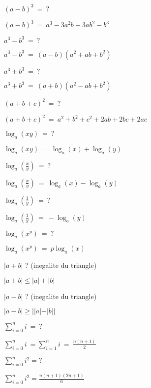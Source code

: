 \documentclass[12pt]{article}
\newcommand*{\xfield}[1]{\begin{mdframed}\centering #1\end{mdframed}\bigskip}
\newenvironment{note}{}{}
\begin{document}
\begin{note}
    \xfield{$(a-b)^3\ =\ ?$}
    \xfield{$(a-b)^3\ =\ a^3 - 3a^2b+3ab^2-b^3$}
\end{note}

\begin{note}
    \xfield{$a^3-b^3\ =\ ?$}
    \xfield{$a^3-b^3\ =\ (a-b)(a^2+ab+b^2)$}
\end{note}

\begin{note}
    \xfield{$a^3+b^3\ =\ ?$}
    \xfield{$a^3+b^3\ =\ (a+b)(a^2-ab+b^2)$}
\end{note}

\begin{note}
    \xfield{$(a+b+c)^2\ =\ ?$}
    \xfield{$(a+b+c)^2\ =\ a^2+b^2+c^2+2ab+2bc+2ac$}
\end{note}

\begin{note}
    \xfield{$\log_a(xy)\ =\ ?$}
    \xfield{$\log_a(xy)\ =\ \log_a(x)+\log_a(y)$}
\end{note}

\begin{note}
    \xfield{$\log_a(\frac{x}{y})\ =\ ?$}
    \xfield{$\log_a(\frac{x}{y})\ =\ \log_a(x)-\log_a(y)$}
\end{note}

\begin{note}
    \xfield{$\log_a(\frac{1}{y})\ =\ ?$}
    \xfield{$\log_a(\frac{1}{y})\ =\ -\log_a(y)$}
\end{note}

\begin{note}
    \xfield{$\log_a(x^p)\ =\ ?$}
    \xfield{$\log_a(x^p)\ =\ p \log_a(x)$}
\end{note}

\begin{note}
    \xfield{$|a+b|$ ? (inegalite du triangle)}
    \xfield{$ |a+b| \leqslant |a| + |b|\ $}
\end{note}

\begin{note}
    \xfield{$|a-b|$ ? (inegalite du triangle)}
    \xfield{$|a - b| \geqslant ||a|-|b||$}
\end{note}

\begin{note}
    \xfield{$\sum_{i=0}^n i\ =\ ? $}
    \xfield{$\sum_{i=0}^n i\ = \sum_{i=1}^n i\ =\ \frac{n(n+1)}{2}$}
\end{note}

\begin{note}
    \xfield{$\sum_{i=0}^n i^2 = ?$}
    \xfield{$\sum_{i=0}^n i^2 = \frac{n(n+1)(2n+1)}{6}$}
\end{note}
\end{document}
